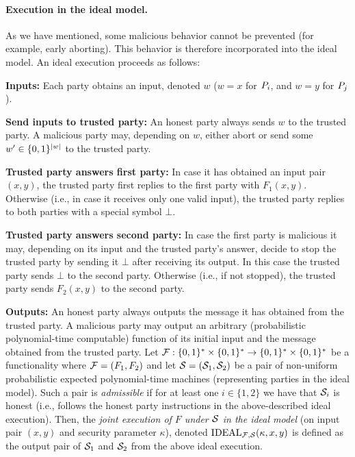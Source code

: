 \paragraph{Execution in the ideal model. } As we have mentioned, some malicious behavior cannot be
prevented (for example, early aborting). This behavior is therefore incorporated into the ideal
model. An ideal execution proceeds as follows:
\BDE
\item {\bf Inputs:} Each party obtains an input, denoted $w$ ($w = x$ for ${P_i}$, and $w = y$ for ${P_j}$).
\item  {\bf Send inputs to trusted party:} An honest party always sends $w$ to the trusted party. A malicious
party may, depending on $w$, either abort or send some $w' \in\{0,1\}^{|w|}$ to the trusted party.
\item  {\bf Trusted party answers first party:} In case it has obtained an input pair $(x, y)$, the trusted
party first replies to the first party with $F_1(x, y)$. Otherwise (i.e., in case it receives only one
valid input), the trusted party replies to both parties with a special symbol $\bot$.
\item  {\bf Trusted party answers second party: } In case the first party is malicious it may, depending on
its input and the trusted party's answer, decide to stop the trusted party by sending it $\bot$ after
receiving its output. In this case the trusted party sends $\bot$ to the second party. Otherwise
(i.e., if not stopped), the trusted party sends $F_2(x, y)$ to the second party.
\item  {\bf Outputs:} An honest party always outputs the message it has obtained from the trusted party. A
malicious party may output an arbitrary (probabilistic polynomial-time computable) function
of its initial input and the message obtained from the trusted party.
\EDE
Let $\mathbf{\mathcal{F}} : \{0,1\}^* \times \{0,1\}^*\rightarrow\{0,1\}^* \times \{0,1\}^*$ be a functionality where $\mathbf{\mathcal{F}} = (F_1, F_2)$ and let ${\cal S} =
({\cal S}_1, {\cal S}_2)$ be a pair of non-uniform probabilistic expected polynomial-time machines (representing
parties in the ideal model). Such a pair is {\em admissible} if for at least one $i\in \{1, 2\}$ we have that ${\cal S}_i$
is honest (i.e., follows the honest party instructions in the above-described ideal execution). Then,
the {\em joint execution of $F$ under ${\cal S}$ in the  ideal model} (on input pair $(x, y)$ and security parameter $\kappa$), denoted $\mbox{\textsc IDEAL}_{\mathbf{\mathcal{F}},{\cal S}}(\kappa,x,y)$
is defined as the output pair of ${\cal S}_1$ and ${\cal S}_2$ from the above ideal execution.


